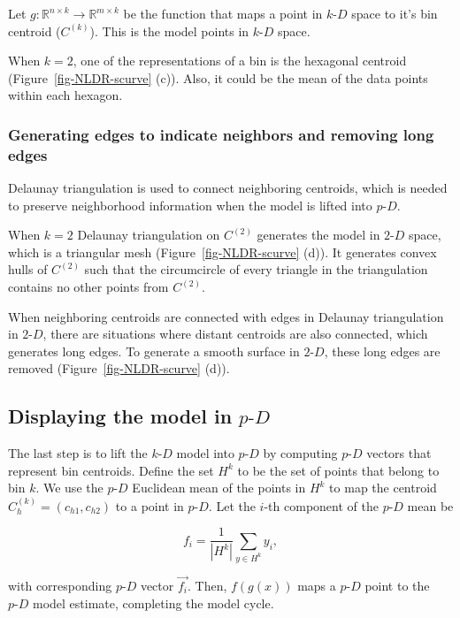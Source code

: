 \documentclass[
  12pt]{article}
\newcommand\pD{$p\text{-}D$}
\newcommand\kD{$k\text{-}D$}
\newcommand\gD{$2\text{-}D$}
\begin{document}
Let \(g : \mathbb{R}^{n\times k} \rightarrow \mathbb{R}^{m\times k}\) be
the function that maps a point in \kD{} space to it's bin centroid
(\(C^{(k)}\)). This is the model points in \kD{} space.

When \(k = 2\), one of the representations of a bin is the hexagonal
centroid (Figure~\ref{fig-NLDR-scurve} (c)). Also, it could be the mean
of the data points within each hexagon.

\subsubsection{Generating edges to indicate neighbors and removing long
edges}\label{generating-edges-to-indicate-neighbors-and-removing-long-edges}

Delaunay triangulation is used to connect neighboring centroids, which
is needed to preserve neighborhood information when the model is lifted
into \pD{}.

When \(k = 2\) Delaunay triangulation on \(C^{(2)}\) generates the model
in \gD{} space, which is a triangular mesh (Figure~\ref{fig-NLDR-scurve}
(d)). It generates convex hulls of \(C^{(2)}\) such that the
circumcircle of every triangle in the triangulation contains no other
points from \(C^{(2)}\).

When neighboring centroids are connected with edges in Delaunay
triangulation in \gD{}, there are situations where distant centroids are
also connected, which generates long edges. To generate a smooth surface
in \gD{}, these long edges are removed (Figure~\ref{fig-NLDR-scurve}
(d)).

\subsection{\texorpdfstring{Displaying the model in
\pD{}}{Displaying the model in }}\label{displaying-the-model-in}

The last step is to lift the \kD{} model into \pD{} by computing \pD{}
vectors that represent bin centroids. Define the set \(H^k\) to be the
set of points that belong to bin \(k\). We use the \pD{} Euclidean mean
of the points in \(H^k\) to map the centroid
\(C_{h}^{(k)} = (c_{h1}, c_{h2})\) to a point in \pD{}. Let the \(i\)-th
component of the \pD{} mean be

\[f_i = \frac{1}{\left|H^k\right|}\sum_{y \in H^k} y_i,\]

with corresponding \pD{} vector \(\vec{f_i}\). Then, \(f(g(x))\) maps a
\pD{} point to the \pD{} model estimate, completing the model cycle.
\end{document}
